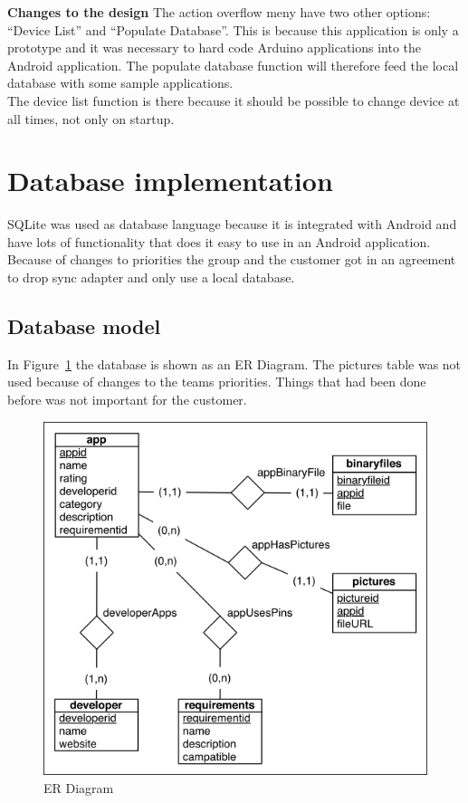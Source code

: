 	\textbf{Changes to the design}
	The action overflow meny have two other options: ``Device List'' and ``Populate Database''. This is because this application is only a prototype and it was necessary to hard code Arduino applications into the Android application. The populate database function will therefore feed the local database with some sample applications.\\

	The device list function is there because it should be possible to change device at all times, not only on startup.\\

\section{Database implementation}

	SQLite was used as database language because it is integrated with Android and have lots of functionality that does it easy to use in an Android application. Because of changes to priorities the group and the customer got in an agreement to drop sync adapter and only use a local database.

	\subsection{Database model}

		In Figure~\ref{fig:erdiagram} the database is shown as an ER Diagram. The pictures table was not used because of changes to the teams priorities. Things that had been done before was not important for the customer.

		\begin{figure}[H]
		\includegraphics[scale=1]{images/ER_Diagram.png}
		\caption{ER Diagram}
		\label{fig:erdiagram}
		\end{figure}

